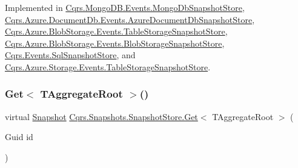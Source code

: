 Implemented in \hyperlink{classCqrs_1_1MongoDB_1_1Events_1_1MongoDbSnapshotStore_acb01680aad8c2671206bc851da17a036_acb01680aad8c2671206bc851da17a036}{Cqrs.\+Mongo\+D\+B.\+Events.\+Mongo\+Db\+Snapshot\+Store}, \hyperlink{classCqrs_1_1Azure_1_1DocumentDb_1_1Events_1_1AzureDocumentDbSnapshotStore_ac924659cdf14b06e31c57e4b1107b739_ac924659cdf14b06e31c57e4b1107b739}{Cqrs.\+Azure.\+Document\+Db.\+Events.\+Azure\+Document\+Db\+Snapshot\+Store}, \hyperlink{classCqrs_1_1Azure_1_1BlobStorage_1_1Events_1_1TableStorageSnapshotStore_a169361a7fbf413fed660609f66d95e13_a169361a7fbf413fed660609f66d95e13}{Cqrs.\+Azure.\+Blob\+Storage.\+Events.\+Table\+Storage\+Snapshot\+Store}, \hyperlink{classCqrs_1_1Azure_1_1BlobStorage_1_1Events_1_1BlobStorageSnapshotStore_a0d5d8af1e7e243d05ccc064b532bee2b_a0d5d8af1e7e243d05ccc064b532bee2b}{Cqrs.\+Azure.\+Blob\+Storage.\+Events.\+Blob\+Storage\+Snapshot\+Store}, \hyperlink{classCqrs_1_1Events_1_1SqlSnapshotStore_a074064fc96d192dd6f68be2bb941bb9f_a074064fc96d192dd6f68be2bb941bb9f}{Cqrs.\+Events.\+Sql\+Snapshot\+Store}, and \hyperlink{classCqrs_1_1Azure_1_1Storage_1_1Events_1_1TableStorageSnapshotStore_ac552ed9e69ca9ce8bbd9f14b4ecb546f_ac552ed9e69ca9ce8bbd9f14b4ecb546f}{Cqrs.\+Azure.\+Storage.\+Events.\+Table\+Storage\+Snapshot\+Store}.

\mbox{\label{classCqrs_1_1Snapshots_1_1SnapshotStore_af35423c44786c31d224d52c3796d0d3d_af35423c44786c31d224d52c3796d0d3d}} 
\subsubsection{\texorpdfstring{Get$<$ T\+Aggregate\+Root $>$()}{Get< TAggregateRoot >()}}
{\footnotesize\ttfamily virtual \hyperlink{classCqrs_1_1Snapshots_1_1Snapshot}{Snapshot} \hyperlink{classCqrs_1_1Snapshots_1_1SnapshotStore_ab2ecab1a665c0f2097929d028fe4ac69_ab2ecab1a665c0f2097929d028fe4ac69}{Cqrs.\+Snapshots.\+Snapshot\+Store.\+Get}$<$ T\+Aggregate\+Root $>$ (\begin{DoxyParamCaption}\item[{Guid}]{id }\end{DoxyParamCaption})\hspace{0.3cm}{\ttfamily [virtual]}}



